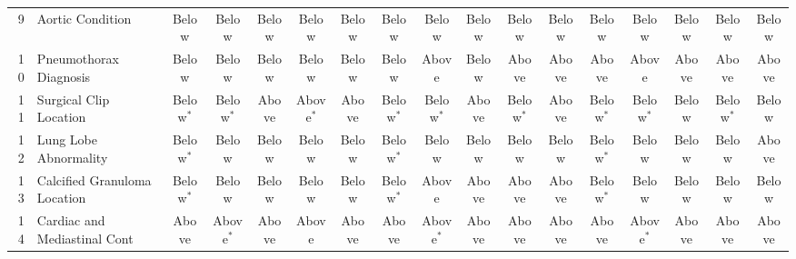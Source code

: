 \begin{landscape}
\begin{table}[p]
\begin{tabular}{rlccccccccccccccc}
9 & Aortic Condition & \cellcolor{red!15}Below & \cellcolor{red!15}Below & \cellcolor{red!15}Below & \cellcolor{red!15}Below & \cellcolor{red!15}Below & \cellcolor{red!15}Below & \cellcolor{red!15}Below & \cellcolor{red!15}Below & \cellcolor{red!15}Below & \cellcolor{red!15}Below & \cellcolor{red!15}Below & \cellcolor{red!15}Below & \cellcolor{red!15}Below & \cellcolor{red!15}Below & \cellcolor{red!15}Below \\
10 & Pneumothorax Diagnosis & \cellcolor{red!15}Below & \cellcolor{red!15}Below & \cellcolor{red!15}Below & \cellcolor{red!15}Below & \cellcolor{red!15}Below & \cellcolor{red!15}Below & \cellcolor{blue!15}Above & \cellcolor{red!15}Below & \cellcolor{blue!15}Above & \cellcolor{blue!15}Above & \cellcolor{blue!15}Above & \cellcolor{blue!15}Above & \cellcolor{blue!15}Above & \cellcolor{blue!15}Above & \cellcolor{blue!15}Above \\
11 & Surgical Clip Location & \cellcolor{red!15}Below$^{\ast}$ & \cellcolor{red!15}Below$^{\ast}$ & \cellcolor{blue!15}Above & \cellcolor{blue!15}Above$^{\ast}$ & \cellcolor{blue!15}Above & \cellcolor{red!15}Below$^{\ast}$ & \cellcolor{red!15}Below$^{\ast}$ & \cellcolor{blue!15}Above & \cellcolor{red!15}Below$^{\ast}$ & \cellcolor{blue!15}Above & \cellcolor{red!15}Below$^{\ast}$ & \cellcolor{red!15}Below$^{\ast}$ & \cellcolor{red!15}Below & \cellcolor{red!15}Below$^{\ast}$ & \cellcolor{red!15}Below \\
12 & Lung Lobe Abnormality & \cellcolor{red!15}Below$^{\ast}$ & \cellcolor{red!15}Below & \cellcolor{red!15}Below & \cellcolor{red!15}Below & \cellcolor{red!15}Below & \cellcolor{red!15}Below$^{\ast}$ & \cellcolor{red!15}Below & \cellcolor{red!15}Below & \cellcolor{red!15}Below & \cellcolor{red!15}Below & \cellcolor{red!15}Below$^{\ast}$ & \cellcolor{red!15}Below & \cellcolor{red!15}Below & \cellcolor{red!15}Below & \cellcolor{blue!15}Above \\
13 & Calcified Granuloma Location & \cellcolor{red!15}Below$^{\ast}$ & \cellcolor{red!15}Below & \cellcolor{red!15}Below & \cellcolor{red!15}Below & \cellcolor{red!15}Below & \cellcolor{red!15}Below$^{\ast}$ & \cellcolor{blue!15}Above & \cellcolor{blue!15}Above & \cellcolor{blue!15}Above & \cellcolor{blue!15}Above & \cellcolor{red!15}Below$^{\ast}$ & \cellcolor{red!15}Below & \cellcolor{red!15}Below & \cellcolor{red!15}Below & \cellcolor{red!15}Below \\
14 & Cardiac and Mediastinal Cont & \cellcolor{blue!15}Above & \cellcolor{blue!15}Above$^{\ast}$ & \cellcolor{blue!15}Above & \cellcolor{blue!15}Above & \cellcolor{blue!15}Above & \cellcolor{blue!15}Above & \cellcolor{blue!15}Above$^{\ast}$ & \cellcolor{blue!15}Above & \cellcolor{blue!15}Above & \cellcolor{blue!15}Above & \cellcolor{blue!15}Above & \cellcolor{blue!15}Above$^{\ast}$ & \cellcolor{blue!15}Above & \cellcolor{blue!15}Above & \cellcolor{blue!15}Above \\

\end{tabular}
\end{table}
\end{landscape}
